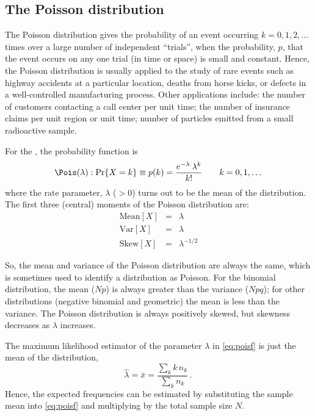 \documentclass[11pt]{book}\usepackage[]{graphicx}\usepackage[]{color}
\begin{document}

\subsection{The Poisson distribution}\label{sec:poisson}

The Poisson distribution gives the probability of an event occurring
$k = 0, 1, 2, \dots$ times over a large number of independent ``trials'',
when the probability, $p$, that the event occurs on any one
trial (in time or space) is small and constant.
Hence, the Poisson distribution is usually applied to the study of
rare events such as highway accidents at a particular location,
deaths from horse kicks, or defects in a well-controlled manufacturing
process.  Other applications include:
the number of customers contacting a call center per unit time;
the number of insurance claims per unit region or unit time;
number of particles emitted from a small radioactive sample.

For the , the probability function
is
\begin{equation}\label{eq:poisf}
\Pois(\lambda):\Pr \{ X = k \} \equiv p (k)=
  \frac{ e^{ - \lambda } \:  \lambda^k } { k ! }
  \quad\quad k = 0, 1, \dots
\end{equation}
where the rate parameter, $\lambda$ ($>0$) turns out to be the mean of the
distribution.
The first three (central) moments of the Poisson distribution are:
\begin{eqnarray*}
\textrm{Mean}[X] & = & \lambda \\
\textrm{Var}[X] &  = & \lambda \\
\textrm{Skew}[X] & = & \lambda^{- 1/2} 
\end{eqnarray*}

So, the mean and variance of the Poisson distribution are always
the same, which is sometimes used to identify a distribution
as Poisson.  For the binomial distribution, the mean ($Np$) is always
greater than the variance ($Npq$); for other distributions
(negative binomial and geometric) the mean is less than the
variance. The Poisson distribution is always positively skewed,
but skewness decreases as $\lambda$ increases.

The maximum likelihood estimator of the parameter \(\lambda\)
in \eqref{eq:poisf} is just
the mean of the distribution,
\begin{equation}
  \hat{\lambda}= \bar{x} = \frac{\sum_k k \,  n_k}{\sum_k  n_k} \label{eq:pois-lambda}
  \period
\end{equation}
Hence, the expected frequencies can be estimated by substituting the
sample mean into \eqref{eq:poisf} and multiplying by the total
sample size $N$.
\end{document}
